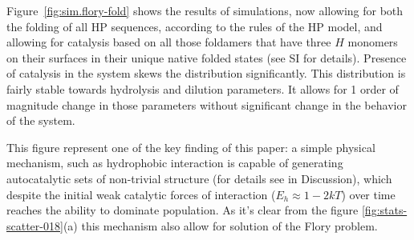 \documentclass[journal=jacsat,manuscript=article,layout=twocolumn]{achemso}
\begin{document}
Figure~\ref{fig:sim.flory-fold} shows the results of simulations, now allowing for both the 
folding of all HP sequences, according to the rules of the HP model, and allowing for catalysis 
based on all those foldamers that have three $H$ monomers on their surfaces in their unique native 
folded states (see SI for details). Presence of catalysis in the system skews the distribution 
significantly. This distribution is fairly stable towards hydrolysis and dilution
parameters. It allows for 1 order of magnitude change in those parameters without significant 
change in the behavior of the system.

This figure represent one of the key finding of this paper: a simple physical mechanism, such as 
hydrophobic interaction is capable of generating autocatalytic sets of non-trivial structure (for 
details see in Discussion), which despite the initial weak catalytic forces of 
interaction ($E_h\approx 1-2kT$) over time reaches the ability to dominate population. As it's 
clear from the figure \ref{fig:stats-scatter-018}(a) this mechanism also allow for solution of the 
Flory 
problem.
\end{document}
